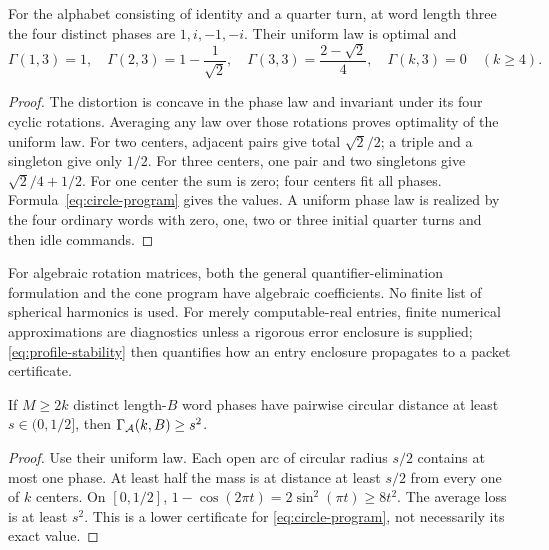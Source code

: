 \begin{proposition}\label{prop:square-packet}
For the alphabet consisting of identity and a quarter turn, at word length three the four distinct phases are $1,i,-1,-i$. Their uniform law is optimal and
\[
 \Gamma(1,3)=1,\quad \Gamma(2,3)=1-\frac1{\sqrt2},\quad
 \Gamma(3,3)=\frac{2-\sqrt2}{4},\quad \Gamma(k,3)=0\quad(k\ge4).
\]
\end{proposition}
\begin{proof}
The distortion is concave in the phase law and invariant under its four cyclic rotations. Averaging any law over those rotations proves optimality of the uniform law. For two centers, adjacent pairs give total $\sqrt2/2$; a triple and a singleton give only $1/2$. For three centers, one pair and two singletons give $\sqrt2/4+1/2$. For one center the sum is zero; four centers fit all phases. Formula~\eqref{eq:circle-program} gives the values. A uniform phase law is realized by the four ordinary words with zero, one, two or three initial quarter turns and then idle commands.
\end{proof}

For algebraic rotation matrices, both the general quantifier-elimination formulation and the cone program have algebraic coefficients. No finite list of spherical harmonics is used. For merely computable-real entries, finite numerical approximations are diagnostics unless a rigorous error enclosure is supplied; \eqref{eq:profile-stability} then quantifies how an entry enclosure propagates to a packet certificate.

\begin{corollary}\label{cor:separated}
If $M\ge2k$ distinct length-$B$ word phases have pairwise circular distance at least $s\in(0,1/2]$, then $\Gamma_{\mathcal A}(k,B)\ge s^2$.
\end{corollary}
\begin{proof}
Use their uniform law. Each open arc of circular radius $s/2$ contains at most one phase. At least half the mass is at distance at least $s/2$ from every one of $k$ centers. On $[0,1/2]$,
$1-\cos(2\pi t)=2\sin^2(\pi t)\ge8t^2$.
The average loss is at least $s^2$. This is a lower certificate for \eqref{eq:circle-program}, not necessarily its exact value.
\end{proof}
